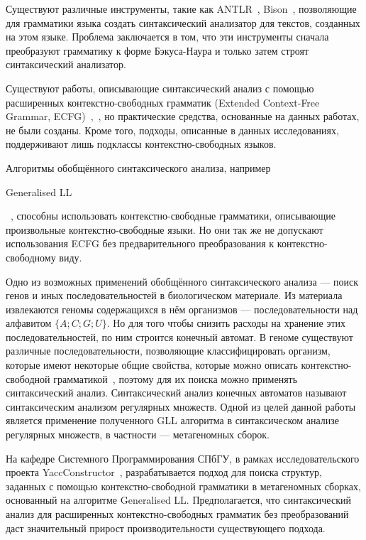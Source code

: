 \documentclass[14pt]{matmex-diploma-custom}
\begin{document}
	Существуют различные инструменты, такие как ANTLR~\cite{ANTLR}, Bison~\cite{Bison},
    позволяющие для грамматики языка создать синтаксический анализатор для текстов, созданных на этом языке.
	Проблема заключается в том, что эти инструменты
	сначала преобразуют грамматику к форме Бэкуса-Наура и только затем
	строят синтаксический анализатор.
	
	Существуют работы, описывающие синтаксический анализ с помощью расширенных
	контекстно-свободных грамматик (Extended Context-Free Grammar, ECFG)~\cite{Breveglieri2014},~\cite{lee1997characterization},
	но практические средства, основанные на данных работах, не были созданы. Кроме того, подходы, описанные
	в данных исследованиях, поддерживают лишь подклассы контекстно-свободных языков.
	
	Алгоритмы обобщённого синтаксического анализа, например
    \begin{english} Generalised LL \end{english}~\cite{scott2010gll}, 
	способны использовать контекстно-свободные грамматики, описывающие произвольные 
	контекстно-свободные языки. Но они так же не допускают использования ECFG 
	без предварительного преобразования к контекстно-свободному виду.
	
	Одно из возможных применений обобщённого синтаксического анализа --- поиск генов и иных последовательностей в биологическом материале. 
	Из материала извлекаются геномы содержащихся в нём организмов --- последовательности над алфавитом $\{A;C; G; U\}$.
    Но для того чтобы снизить расходы на хранение этих последовательностей, по ним строится конечный автомат.
    В геноме существуют различные последовательности, позволяющие классифицировать организм, которые имеют некоторые общие свойства, которые можно описать 
    контекстно-свободной грамматикой~\cite{Anderson2013}, поэтому для их поиска можно применять синтаксический анализ.
    Синтаксический анализ конечных автоматов называют 
    синтаксическим анализом регулярных множеств. Одной из целей данной работы является применение
    полученного GLL алгоритма в
	синтаксическом анализе регулярных множеств, в частности --- метагеномных сборок.
	
	На кафедре Системного Программирования СПбГУ, в рамках исследовательского проекта YaccConstructor~\cite{YaccConstructor},
	разрабатывается подход для поиска структур, заданных с помощью контекстно-свободной
	грамматики в метагеномных сборках, основанный на алгоритме Generalised LL.
	Предполагается, что синтаксический анализ для расширенных контекстно-свободных грамматик
    без преобразований даст значительный прирост производительности существующего подхода.
	
\end{document}
